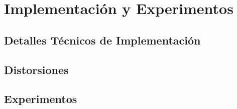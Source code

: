 \chapter{Implementación y Experimentos} 
\section{Detalles Técnicos de Implementación} 
\section{Distorsiones}
\section{Experimentos} 
